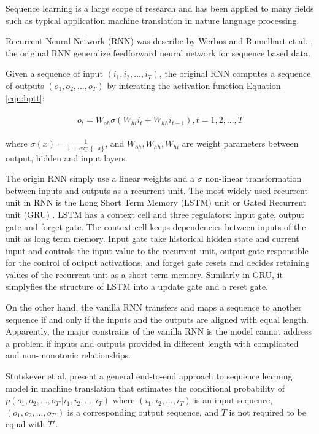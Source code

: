 Sequence learning is a large scope of research and has been applied to many fields such as 
typical application machine translation in nature language processing. 

Recurrent Neural Network (RNN) was describe by Werbos \cite{werbos1990rnn} and 
Rumelhart et al. \cite{Rumelhart:1988:LRB:65669.104451}, the original RNN 
generalize feedforward neural network for sequence based data.

Given a sequence of input $(i_1, i_2, ..., i_T)$, the original RNN computes a
sequence of outputs $(o_1, o_2, ..., o_T)$ 
by interating the activation function Equation \ref{eqn:bptt}:

\begin{align}
\label{eqn:bptt}
\begin{split}
    o_t = W_{oh} \sigma \left( W_{hi}i_{t} + W_{hh}i_{t-1}\right), t=1,2,...,T
\end{split}
\end{align}

where $\sigma(x) = \frac{1}{1+\exp\{-x\}}$,
and $W_{oh}, W_{hh}, W_{hi}$ are weight parameters between output, hidden and input layers.

The origin RNN simply use a linear weights and a $\sigma$ non-linear transformation between 
inputs and outputs as a recurrent unit. The most widely used recurrent unit in RNN is the
Long Short Term Memory (LSTM) unit \cite{hochreiter1997lstm} or Gated Recurrent unit (GRU) \cite{DBLP:journals/corr/ChoMGBSB14}.
LSTM has a context cell and three regulators: Input gate, 
output gate and forget gate.
The context cell keeps dependencies between inputs of the unit as long term memory. 
Input gate take historical hidden state and current input and controls the input value to
the recurrent unit, output gate responsible for the control of output activations, and
forget gate resets and decides retaining values of the recurrent unit as a short term memory.
Similarly in GRU, it simplyfies the structure of LSTM into a update gate and a reset gate.

On the other hand, the vanilla RNN transfers and maps a sequence to another sequence if and only if the inputs
and the outputs are aligned with equal length. Apparently, the major constrains of the vanilla RNN
is the model cannot address a problem if inputs and outputs provided in different length with 
complicated and non-monotonic relationships.

Stutskever et al. \cite{DBLP:journals/corr/SutskeverVL14} present a general end-to-end approach
to sequence learning model in machine translation that estimates the conditional probability of 
$p(o_1, o_2, ..., o_{T'} | i_1, i_2, ..., i_T)$ where $(i_1, i_2, ..., i_T)$ is an input sequence,
$(o_1, o_2, ..., o_{T'})$ is a corresponding output sequence, and $T$ is not required to be equal with $T'$.

